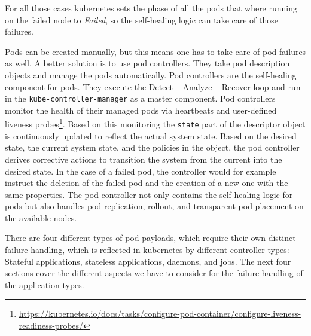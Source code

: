  For all those cases \gls{kubernetes} sets the phase of all the pods that where running on the failed node to \textit{Failed}, so the self-healing logic can take care of those failures.

  Pods can be created manually, but this means one has to take care of pod failures as well.
  A better solution is to use pod controllers.
  They take pod description objects and manage the pods automatically.
  Pod controllers are the self-healing component for pods.
  They execute the Detect -- Analyze -- Recover loop and run in the \texttt{kube-controller-manager} as a master component.
  Pod controllers monitor the health of their managed pods via heartbeats and user-defined liveness probes\footnote{\url{https://kubernetes.io/docs/tasks/configure-pod-container/configure-liveness-readiness-probes/}}.
  Based on this monitoring the \texttt{state} part of the descriptor object is continuously updated to reflect the actual system state.
  Based on the desired state, the current system state, and the policies in the object, the pod controller derives corrective actions to transition the system from the current into the desired state.
  In the case of a failed pod, the controller would for example instruct the deletion of the failed pod and the creation of a new one with the same properties.
  The pod controller not only contains the self-healing logic for pods but also handles pod replication, rollout, and transparent pod placement on the available nodes.

  There are four different types of pod payloads, which require their own distinct failure handling, which is reflected in \gls{kubernetes} by different controller types:
  Stateful applications, stateless applications, daemons, and jobs.
  The next four sections cover the different aspects we have to consider for the failure handling of the application types.

